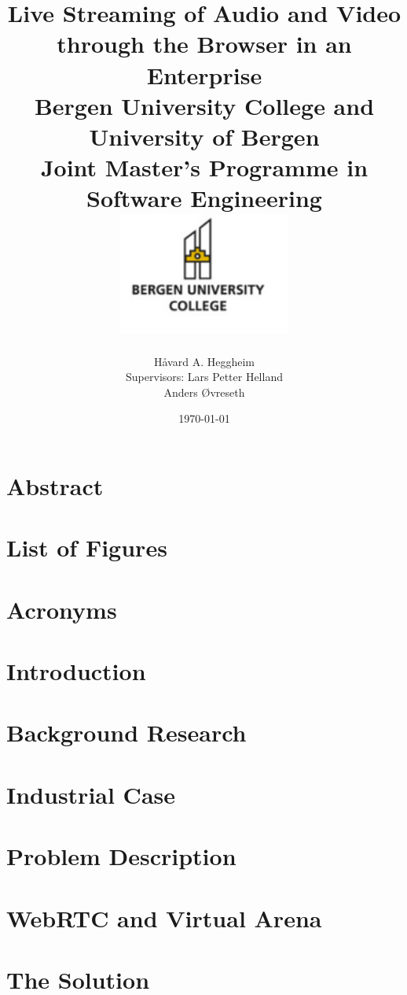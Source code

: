 \documentclass[11pt,a4paper]{report}
\author{H\aa vard A. Heggheim\\[1cm]
Supervisors: Lars Petter Helland\\Anders Øvreseth}
\date{\today}
\title{
 {\huge Live Streaming of Audio and Video through the Browser in an Enterprise}\\[0.4cm]
 {\large Bergen University College and University of Bergen}\\
 {\large Joint Master's Programme in Software Engineering}\\[1cm]
 {\includegraphics[height=4cm]{hib_small.jpg}}
}
\begin{document}
\maketitle


\chapter*{Abstract}


\tableofcontents

\chapter*{List of Figures}

\chapter*{Acronyms}




\chapter{Introduction}

\chapter{Background Research}
%

\chapter{Industrial Case}
%

\chapter{Problem Description}


\chapter{WebRTC and Virtual Arena}


\chapter{The Solution}

\end{document}
